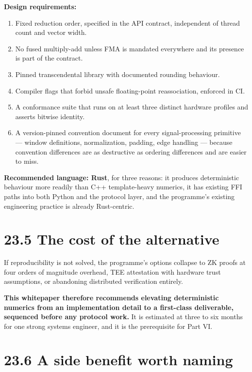 \documentclass[
  11pt]{report}
\providecommand{\tightlist}{%
  \setlength{\itemsep}{0pt}\setlength{\parskip}{0pt}}
\begin{document}
\textbf{Design requirements:}

\begin{enumerate}
\def\labelenumi{\arabic{enumi}.}
\tightlist
\item
  Fixed reduction order, specified in the API contract, independent of
  thread count and vector width.
\item
  No fused multiply-add unless FMA is mandated everywhere and its
  presence is part of the contract.
\item
  Pinned transcendental library with documented rounding behaviour.
\item
  Compiler flags that forbid unsafe floating-point reassociation,
  enforced in CI.
\item
  A conformance suite that runs on at least three distinct hardware
  profiles and asserts bitwise identity.
\item
  A version-pinned convention document for every signal-processing
  primitive --- window definitions, normalization, padding, edge
  handling --- because convention differences are as destructive as
  ordering differences and are easier to miss.
\end{enumerate}

\textbf{Recommended language: Rust}, for three reasons: it produces
deterministic behaviour more readily than C++ template-heavy numerics,
it has existing FFI paths into both Python and the protocol layer, and
the programme's existing engineering practice is already Rust-centric.

\hypertarget{the-cost-of-the-alternative}{%
\section{23.5 The cost of the
alternative}\label{the-cost-of-the-alternative}}

If reproducibility is not solved, the programme's options collapse to ZK
proofs at four orders of magnitude overhead, TEE attestation with
hardware trust assumptions, or abandoning distributed verification
entirely.

\textbf{This whitepaper therefore recommends elevating deterministic
numerics from an implementation detail to a first-class deliverable,
sequenced before any protocol work.} It is estimated at three to six
months for one strong systems engineer, and it is the prerequisite for
Part VI.

\hypertarget{a-side-benefit-worth-naming}{%
\section{23.6 A side benefit worth
naming}\label{a-side-benefit-worth-naming}}
\end{document}
